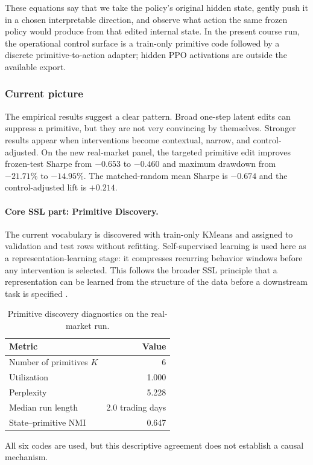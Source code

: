 \documentclass[11pt,a4paper]{article}
\begin{document}
These equations say that we take the policy's original hidden state, gently push it in a chosen interpretable direction, and observe what action the same frozen policy would produce from that edited internal state. In the present course run, the operational control surface is a train-only primitive code followed by a discrete primitive-to-action adapter; hidden PPO activations are outside the available export.

\subsubsection{Current picture}
The empirical results suggest a clear pattern. Broad one-step latent edits can suppress a primitive, but they are not very convincing by themselves. Stronger results appear when interventions become contextual, narrow, and control-adjusted. On the new real-market panel, the targeted primitive edit improves frozen-test Sharpe from $-0.653$ to $-0.460$ and maximum drawdown from $-21.71\%$ to $-14.95\%$. The matched-random mean Sharpe is $-0.674$ and the control-adjusted lift is $+0.214$.

\paragraph{Core SSL part: Primitive Discovery.}
The current vocabulary is discovered with train-only KMeans and assigned to validation and test rows without refitting. Self-supervised learning is used here as a representation-learning stage: it compresses recurring behavior windows before any intervention is selected. This follows the broader SSL principle that a representation can be learned from the structure of the data before a downstream task is specified \cite{oord2017vqvae,hjelm2019infomax,chen2020simclr,he2020moco,grill2020byol}.

\begin{table}[H]
\centering
\caption{Primitive discovery diagnostics on the real-market run.}
\label{tab:primitive-quality}
\begin{tabular}{@{}lr@{}}
\toprule
Metric & Value\\
\midrule
Number of primitives $K$ & 6\\
Utilization & 1.000\\
Perplexity & 5.228\\
Median run length & 2.0 trading days\\
State--primitive NMI & 0.647\\
\bottomrule
\end{tabular}
\end{table}
All six codes are used, but this descriptive agreement does not establish a causal mechanism.
\end{document}
